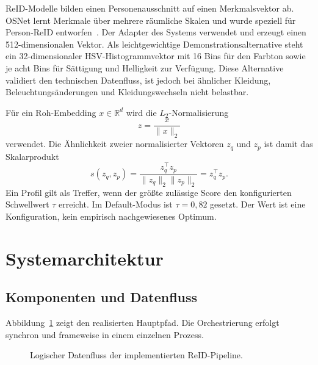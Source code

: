 \documentclass[runningheads]{llncs}
\begin{document}
ReID-Modelle bilden einen Personenausschnitt auf einen Merkmalsvektor ab. OSNet lernt Merkmale über mehrere räumliche Skalen und wurde speziell für Person-ReID entworfen~\cite{zhou2019osnet}. Der Adapter des Systems verwendet  und erzeugt einen 512-dimensionalen Vektor. Als leichtgewichtige Demonstrationsalternative steht ein 32-dimensionaler HSV-Histogrammvektor mit 16 Bins für den Farbton sowie je acht Bins für Sättigung und Helligkeit zur Verfügung. Diese Alternative validiert den technischen Datenfluss, ist jedoch bei ähnlicher Kleidung, Beleuchtungsänderungen und Kleidungswechseln nicht belastbar.

Für ein Roh-Embedding $x \in \mathbb{R}^{d}$ wird die $L_2$-Normalisierung
\begin{equation}
z = \frac{x}{\lVert x \rVert_2}
\label{eq:normalization}
\end{equation}
verwendet. Die Ähnlichkeit zweier normalisierter Vektoren $z_q$ und $z_p$ ist damit das Skalarprodukt
\begin{equation}
s(z_q,z_p) = \frac{z_q^\top z_p}{\lVert z_q\rVert_2\lVert z_p\rVert_2}=z_q^\top z_p.
\label{eq:cosine}
\end{equation}
Ein Profil gilt als Treffer, wenn der größte zulässige Score den konfigurierten Schwellwert $\tau$ erreicht. Im Default-Modus ist $\tau=0{,}82$ gesetzt. Der Wert ist eine Konfiguration, kein empirisch nachgewiesenes Optimum.

\section{Systemarchitektur}

\subsection{Komponenten und Datenfluss}

Abbildung~\ref{fig:architecture} zeigt den realisierten Hauptpfad. Die Orchestrierung erfolgt synchron und frameweise in einem einzelnen Prozess.

\begin{figure}[t]
\centering
{}
\caption{Logischer Datenfluss der implementierten ReID-Pipeline.}
\label{fig:architecture}
\end{figure}
\end{document}
